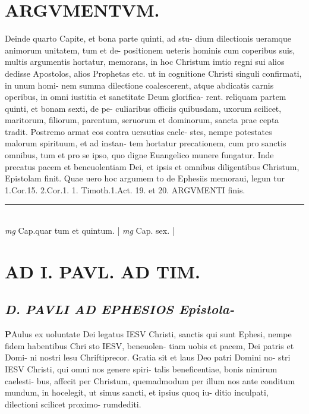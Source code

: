 \documentclass{article}
\begin{document}
\begin{pages}
\section*{ARGVMENTVM.  }\pstart Deinde quarto Capite, et bona parte quinti, ad stu- dium dilectionis ueramque animorum unitatem, tum et de- positionem ueteris hominis cum coperibus suis, multis argumentis hortatur, memorans, in hoc Christum imtio regni sui alios dedisse Apostolos, alios Prophetas etc. ut in cognitione Christi singuli confirmati, in unum homi- nem summa dilectione coalescerent, atque abdicatis carnis operibus, in omni iustitia et sanctitate Deum glorifica- rent. reliquam partem quinti, et bonam sexti, de pe- culiaribus officiis quibusdam, uxorum scilicet, maritorum, filiorum, parentum, seruorum et dominorum, sancta prae cepta tradit.  Postremo armat eos contra uersutias caele- stes, nempe potestates malorum spirituum, et ad instan- tem hortatur precationem, cum pro sanctis omnibus, tum et pro se ipso, quo digne Euangelico munere fungatur.  Inde precatus pacem et beneuolentiam Dei, et ipsis et omnibus diligentibus Christum, Epistolam finit. Quae uero hoc argumem to de Ephesiis memoraui, legun tur 1.Cor.15. 2.Cor.1. 1. Timoth.1.Act. 19. et 20. ARGVMENTI finis.   \pend
\vspace{0.5cm}\noindent
\vspace{0.2cm}\rule{1cm}{0.2pt}\\ 
\hspace{0.2cm}\textit{mg}
\footnotesize Cap.quar tum et quintum. 
\normalsize| 
\hspace{0.2cm}\textit{mg}
\footnotesize Cap.  sex.  
\normalsize| 
\section*{AD I. PAVL. AD TIM. }
\marginpar{[ p.9 ]}
\marginpar{[ p.10 ]}
\marginpar{[ p.11 ]}
\marginpar{[ p.B ]}
{}
\subsection*{\textit{D. PAVLI AD EPHESIOS Epistola- }}\pstart \huge\textbf{P}\normalsize Aulus ex uoluntate Dei legatus IESV Christi, sanctis qui sunt Ephesi, nempe fidem habentibus Chri sto IESV, beneuolen- tiam uobis et pacem, Dei patris et Domi- ni nostri lesu Chriftiprecor.  \pend\pstart Gratia sit et laus Deo patri Domini no- stri IESV Christi, qui omni nos genere spiri- talis beneficentiae, bonis nimirum caelesti- bus, affecit per Christum, quemadmodum per illum nos ante conditum mundum, in hocelegit, ut simus sancti, et ipsius quoq iu- ditio inculpati, dilectioni scilicet proximo- rumdediti.  \pend

\end{pages}
\end{document}
